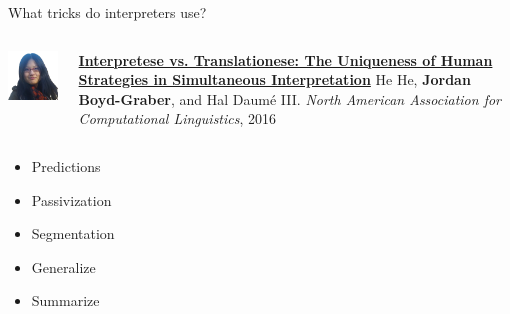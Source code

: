 \documentclass[compress]{beamer}
\begin{document}
\begin{frame}{What tricks do interpreters use?}

  \begin{columns}
        \includegraphics[width=0.8\linewidth]{general_figures/hehe}
    \centering
        \begin{block}{ {\bf \href{http://cs.colorado.edu/~jbg/docs/2016_naacl_interpretese.pdf}{Interpretese vs. Translationese: The Uniqueness of Human Strategies in Simultaneous Interpretation}}}
He He, {\bf Jordan Boyd-Graber}, and Hal {Daum\'{e} III}.
\emph{North American Association for Computational Linguistics}, 2016
        \end{block}
  \end{columns}

  \begin{itemize}
    \item Predictions~\cite{levy2013expectation,momma2015timing}
    \item Passivization
    \item Segmentation~\cite{erik11theory,shimizu13iwslt}
    \item Generalize~\cite{dell92access,cuetos06access}
    \item Summarize
  \end{itemize}



\end{frame}
\end{document}
